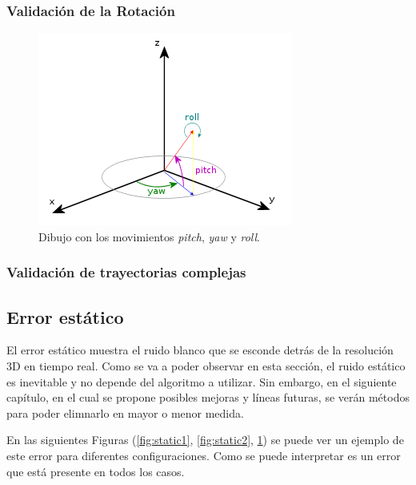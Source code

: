 \subsubsection{Validación de la Rotación}

\begin{figure}[th]
\centering
\includegraphics[scale=0.9]{Figures/pitch_yaw_roll.png}
\decoRule
\caption[Explicación gráfica del movimiento \textit{pitch}, \textit{yaw} y \textit{roll}]{Dibujo con los movimientos \textit{pitch}, \textit{yaw} y \textit{roll}.}
\label{fig:static3}
\end{figure}

\subsubsection{Validación de trayectorias complejas}

\subsection{Error estático}

El error estático muestra el ruido blanco que se esconde detrás de la resolución 3D en tiempo real. Como se va a poder observar en esta sección, el ruido estático es inevitable y no depende del algoritmo a utilizar. Sin embargo, en el siguiente capítulo, en el cual se propone posibles mejoras y líneas futuras, se verán métodos para poder elimnarlo en mayor o menor medida.

En las siguientes Figuras (\ref{fig:static1}, \ref{fig:static2}, \ref{fig:static3}) se puede ver un ejemplo de este error para diferentes configuraciones. Como se puede interpretar es un error que está presente en todos los casos.

